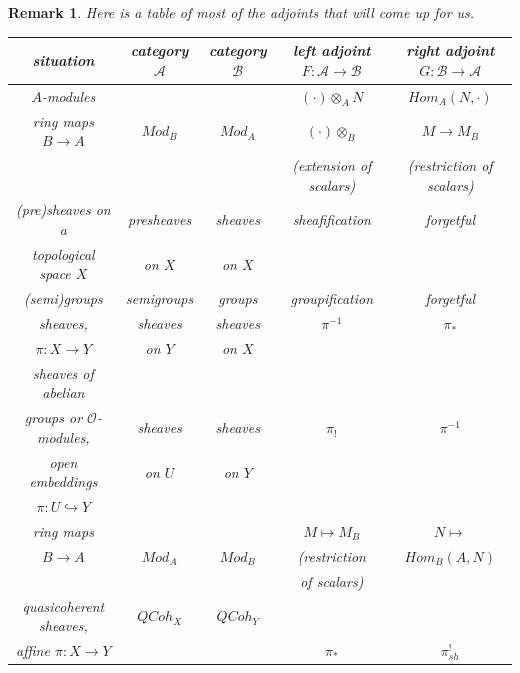 \documentclass{article}
\newtheorem{remark}[theorem]{Remark}
\begin{document}
\begin{remark}
    Here is a table of most of the adjoints that will come up for us.
    \begin{table}[h!]
\begin{center}
    \begin{tabular}{c|c|c|c|c} %
      \textbf{situation} 
      & \textbf{category}$\mathscr A$ 
      & \textbf{category}$\mathscr B$ 
      &
      \textbf{left adjoint} 
      $F:\mathscr A \rightarrow \mathscr B$ 
      &
      \textbf{right adjoint}
      $G:\mathscr B \rightarrow\mathscr A$
      \\
      \hline
      $A$-modules &  &  & $(\cdot) \otimes_A N$ & $Hom_A(N, \cdot)$\\
     \hline
      ring maps $B \rightarrow A$ & $Mod_B$ & $Mod_A$ & $(\cdot) \otimes_B$ & $M \rightarrow M_B$
      \\ & & &(extension of scalars) & (restriction of scalars) \\
     \hline
       (pre)sheaves on a & presheaves & sheaves & sheafification & forgetful\\ topological space  $X$  & on $X$ &  on $X$ & &\\
     \hline
      (semi)groups & semigroups & groups & groupification & forgetful \\
     \hline
      sheaves, & sheaves & sheaves & $\pi^{-1}$ & $\pi_\ast$
      \\
      $\pi: X\rightarrow Y$ & on $Y$ & on $X$ & &\\ 
      \hline
      sheaves of abelian & & & & \\ 
      groups or $\mathscr O$-modules, & sheaves & sheaves & $\pi_!$ & $\pi^{-1}$\\
      open embeddings & on $U$ & on $Y$ & &\\
      $\pi: U \hookrightarrow Y$ & & & &\\
      \hline
      ring maps & & & $M \mapsto M_B$ & $N \mapsto$
      \\
      $B \rightarrow A$ & $Mod_A$ & $Mod_B$  & (restriction & $Hom_B(A, N)$
      \\
       & & & of scalars) &
      \\
      \hline
      quasicoherent sheaves, & $QCoh_X$ & $QCoh_Y$ & &
      \\
      affine $\pi: X \rightarrow Y$ & & & $\pi_\ast$ & $\pi^!_{sh}$
      \\
    \end{tabular}
\end{center}
\end{table}
\end{remark}
\end{document}
